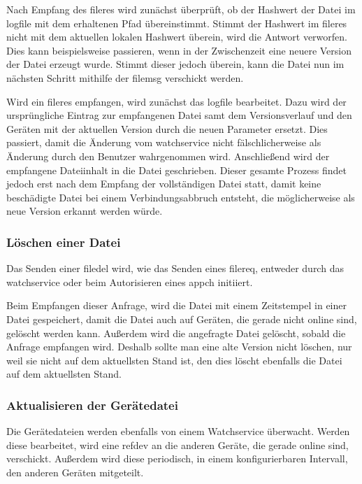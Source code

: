 Nach Empfang des \gls{fileres} wird zunächst überprüft, ob der Hashwert der Datei im \gls{logfile} mit dem erhaltenen Pfad übereinstimmt. Stimmt der Hashwert im \gls{fileres} nicht mit dem aktuellen lokalen Hashwert überein, wird die Antwort verworfen. Dies kann beispielsweise passieren, wenn in der Zwischenzeit eine neuere Version der Datei erzeugt wurde. Stimmt dieser jedoch überein, kann die Datei nun im nächsten Schritt mithilfe der \gls{filemsg} verschickt werden.

Wird ein \gls{fileres} empfangen, wird zunächst das \gls{logfile} bearbeitet. Dazu wird der ursprüngliche Eintrag zur empfangenen Datei samt dem Versionsverlauf und den Geräten mit der aktuellen Version durch die neuen Parameter ersetzt. Dies passiert, damit die Änderung vom \gls{watchservice} nicht fälschlicherweise als Änderung durch den Benutzer wahrgenommen wird. Anschließend wird der empfangene Dateiinhalt in die Datei geschrieben. Dieser gesamte Prozess findet jedoch erst nach dem Empfang der vollständigen Datei statt, damit keine beschädigte Datei bei einem Verbindungsabbruch entsteht, die möglicherweise als neue Version erkannt werden würde.

\subsubsection{Löschen einer Datei}
Das Senden einer \gls{filedel} wird, wie das Senden eines \gls{filereq}, entweder durch das \gls{watchservice} oder beim Autorisieren eines \gls{appch} initiiert. 

Beim Empfangen dieser Anfrage, wird die Datei mit einem Zeitstempel in einer Datei gespeichert, damit die Datei auch auf Geräten, die gerade nicht online sind, gelöscht werden kann. Außerdem wird die angefragte Datei gelöscht, sobald die Anfrage empfangen wird. Deshalb sollte man eine alte Version nicht löschen, nur weil sie nicht auf dem aktuellsten Stand ist, den dies löscht ebenfalls die Datei auf dem aktuellsten Stand.

\subsubsection{Aktualisieren der Gerätedatei}
Die Gerätedateien werden ebenfalls von einem Watchservice überwacht. Werden diese bearbeitet, wird eine \gls{refdev} an die anderen Geräte, die gerade online sind, verschickt. Außerdem wird diese periodisch, in einem konfigurierbaren Intervall, den anderen Geräten mitgeteilt.